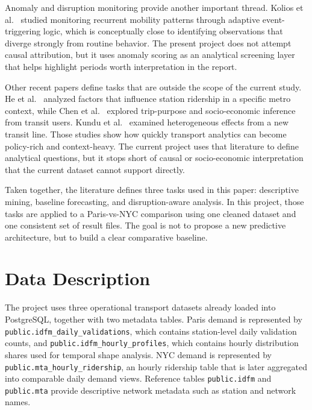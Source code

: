 \documentclass[10pt,twocolumn,a4paper]{article}
\begin{document}
Anomaly and disruption monitoring provide another important thread. Kolios et
al.~\cite{kolios2023monitoring} studied monitoring recurrent mobility patterns
through adaptive event-triggering logic, which is conceptually close to
identifying observations that diverge strongly from routine behavior.
The present project does not attempt causal attribution, but it uses anomaly
scoring as an analytical screening layer that helps highlight periods worth
interpretation in the report.

Other recent papers define tasks that are outside the scope of the current
study. He et al.~\cite{he2018ridership} analyzed factors that
influence station ridership in a specific metro context, while Chen
et al.~\cite{chen2025trip} explored trip-purpose and socio-economic inference
from transit users. Kundu et al.~\cite{kundu2025line} examined heterogeneous
effects from a new transit line. Those studies show how quickly transport
analytics can become policy-rich and context-heavy. The current project uses
that literature to define analytical questions, but it stops short of causal or
socio-economic interpretation that the current dataset cannot support directly.

Taken together, the literature defines three tasks used in this paper:
descriptive mining, baseline forecasting, and disruption-aware analysis.
In this project, those tasks are applied to a Paris-vs-NYC comparison using
one cleaned dataset and one consistent set of result files. The goal is not to
propose a new predictive architecture, but to build a clear comparative
baseline.

\section{Data Description}

The project uses three operational transport datasets already loaded into
PostgreSQL, together with two metadata tables. Paris demand is represented by
\nolinkurl{public.idfm_daily_validations}, which contains station-level daily
validation counts, and \nolinkurl{public.idfm_hourly_profiles}, which contains
hourly distribution shares used for temporal shape analysis. NYC demand is
represented by \nolinkurl{public.mta_hourly_ridership}, an hourly ridership
table that is later aggregated into comparable daily demand views. Reference
tables \nolinkurl{public.idfm} and \nolinkurl{public.mta} provide descriptive
network metadata such as station and network names.
\end{document}
